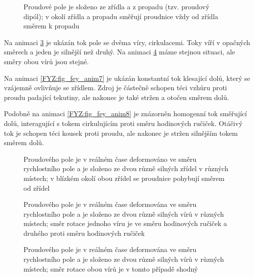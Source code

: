 {    \begin{figure}[ht!]
      \centering
      \caption{Proudové pole je složeno ze zřídla a z propadu (tzv. proudový dipól); v okolí 
               zřídla a propadu směřují proudnice vždy od zřídla směrem k propadu}
      \label{FYZ:fig_fey_anim3}
    \end{figure}

    Na animaci \ref{FYZ:fig_fey_anim5} je ukázán tok pole se dvěma víry, cirkulacemi. Toky víří v 
    opačných směrech a jeden je silnější než druhý. Na animaci \ref{FYZ:fig_fey_anim6} máme stejnou 
    situaci, ale směry obou vírů jsou stejné.    
    
    Na animaci \ref{FYZ:fig_fey_anim7} je ukázán konstantní tok klesající dolů, který se vzájemně 
    ovlivňuje se zřídlem. Zdroj je částečně schopen téci vzhůru proti proudu padající tekutiny, ale 
    nakonec je také stržen a otočen směrem dolů.
    
    Podobně na animaci \ref{FYZ:fig_fey_anim8} je znázorněn homogenní tok směřující dolů, 
    interagující s tokem cirkulujícím proti směru hodinových ručiček. Otáčivý tok je schopen téci 
    kousek proti proudu, ale nakonec je stržen silnějším tokem směrem dolů.

    \begin{figure}[ht!]
      \centering
      \caption{Proudového pole je v reálném čase deformováno ve směru rychlostního pole a je 
               složeno ze dvou různě silných zřídel v různých místech; v blízkém okolí obou zřídel 
               se proudnice pohybují směrem od zřídel}
      \label{FYZ:fig_fey_anim4}
    \end{figure} 

    \begin{figure}[ht!]
      \centering  
      \caption{Proudového pole je v reálném čase deformována ve směru rychlostního pole a je 
               složeno ze dvou různě silných vírů v různých místech; směr rotace jednoho víru je ve 
               směru hodinových ručiček a druhého proti směru hodinových ručiček}
      \label{FYZ:fig_fey_anim5}
    \end{figure} 

    \begin{figure}[ht!]
      \centering
      \caption{Proudového pole je v reálném čase deformována ve směru rychlostního pole a je  
               složeno ze dvou různě silných vírů v různých místech; směr rotace obou vírů je v 
               tomto případě shodný}
      \label{FYZ:fig_fey_anim6}
    \end{figure} 
    
}
